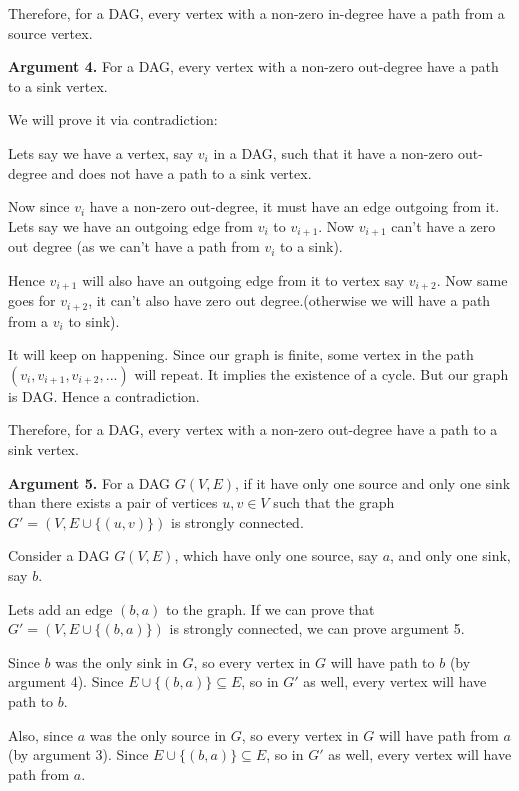 \documentclass[answers]{exam}
\begin{document}
\begin{questions}
\begin{parts}
\begin{solution}
Therefore, for a DAG, every vertex with a non-zero in-degree have a path from a source vertex.\par

\textbf{Argument 4.} For a DAG, every vertex with a non-zero out-degree have a path to a sink vertex.

We will prove it via contradiction:

Lets say we have a vertex, say $v_i$ in a DAG, such that it have a non-zero out-degree and does not have a path to a sink vertex.\par
Now since $v_i$ have a non-zero out-degree, it must have an edge outgoing from it. Lets say we have an outgoing  edge from $v_{i}$ to $v_{i+1}$. Now $v_{i+1}$ can't have a zero out degree (as we can't have a path from $v_i$ to a sink).\par
Hence $v_{i+1}$ will also have an outgoing edge from it to vertex say $v_{i+2}$. Now same goes for $v_{i+2}$, it can't also have zero out degree.(otherwise we will have a path from a $v_i$ to sink). \par
It will keep on happening. Since our graph is finite, some vertex in the path $(v_i,v_{i+1},v_{i+2},...)$ will repeat. It implies the existence of a cycle. But our graph is  DAG. Hence a contradiction. \par

Therefore, for a DAG, every vertex with a non-zero out-degree have a path to a sink vertex.

\textbf{Argument 5.} For a DAG $G(V,E)$, if it have only one source and only one sink than  there exists a pair of vertices $u, v \in V$ such that the graph $G' = (V, E \cup \{(u, v)\})$ is strongly connected.
\par

Consider a DAG $G(V,E)$, which have only one source, say $a$, and only one sink, say $b$.\par

Lets add an edge $(b,a)$ to the graph. If we can prove that $G' = (V, E \cup \{(b, a)\})$ is strongly connected, we can prove argument 5.\par

Since $b$ was the only sink in $G$, so every vertex in $G$ will have path to $b$ (by argument 4). Since $E \cup \{(b, a)\} \subseteq E $, so in $G'$ as well, every vertex will have path to $b$. \par

Also, since $a$ was the only source in $G$, so every vertex in $G$ will have path from $a$ (by argument 3). Since $E \cup \{(b, a)\} \subseteq E $, so in $G'$ as well, every vertex will have path from $a$. \par


\end{solution}
\end{parts}
\end{questions}
\end{document}
